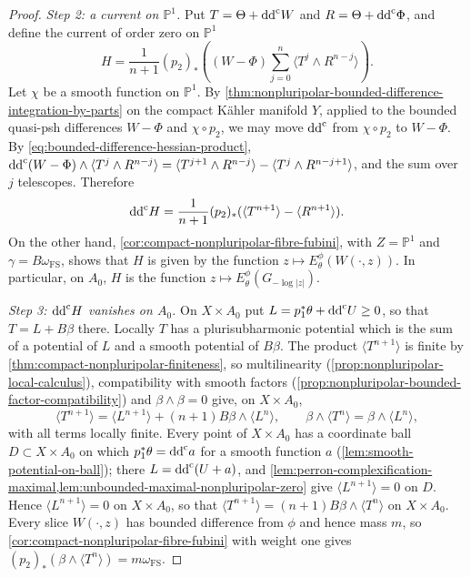 \begin{proof}
\emph{Step 2: a current on $\mathbb P^1$.} Put $T=\Theta+\mathrm{dd}^{\mathrm{c}} W$ and $R=\Theta+\mathrm{dd}^{\mathrm{c}}\Phi$, and define the current of order zero on $\mathbb P^1$
\[
 H=\frac1{n+1}(p_2)_*
       \left((W-\Phi)\sum_{j=0}^n\langle T^j\wedge R^{n-j}\rangle\right).
\]
Let $\chi$ be a smooth function on $\mathbb P^1$. By \cref{thm:nonpluripolar-bounded-difference-integration-by-parts} on the compact K\"ahler manifold $Y$, applied to the bounded quasi-psh differences $W-\Phi$ and $\chi\circ p_2$, we may move $\mathrm{dd}^{\mathrm{c}}$ from $\chi\circ p_2$ to $W-\Phi$. By \eqref{eq:bounded-difference-hessian-product}, $\mathrm{dd}^{\mathrm{c}}(W-\Phi)\wedge\langle T^j\wedge R^{n-j}\rangle=\langle T^{j+1}\wedge R^{n-j}\rangle-\langle T^j\wedge R^{n-j+1}\rangle$, and the sum over $j$ telescopes. Therefore
\begin{equation}\label{eq:relative-geodesic-energy-current-curvature}
 \mathrm{dd}^{\mathrm{c}} H=\frac1{n+1}(p_2)_*
                         (\langle T^{n+1}\rangle-\langle R^{n+1}\rangle).
\end{equation}
On the other hand, \cref{cor:compact-nonpluripolar-fibre-fubini}, with $Z=\mathbb P^1$ and $\gamma=B\omega_{\mathrm{FS}}$, shows that $H$ is given by the function $z\mapsto E_\theta^\phi(W(\cdot,z))$. In particular, on $A_0$, $H$ is the function $z\mapsto E_\theta^\phi(G_{-\log|z|})$.

\emph{Step 3: $\mathrm{dd}^{\mathrm{c}} H$ vanishes on $A_0$.} On $X\times A_0$ put $L=p_1^*\theta+\mathrm{dd}^{\mathrm{c}} U\geq0$, so that $T=L+B\beta$ there. Locally $T$ has a plurisubharmonic potential which is the sum of a potential of $L$ and a smooth potential of $B\beta$. The product $\langle T^{n+1}\rangle$ is finite by \cref{thm:compact-nonpluripolar-finiteness}, so multilinearity (\cref{prop:nonpluripolar-local-calculus}), compatibility with smooth factors (\cref{prop:nonpluripolar-bounded-factor-compatibility}) and $\beta\wedge\beta=0$ give, on $X\times A_0$,
\[
 \langle T^{n+1}\rangle
       =\langle L^{n+1}\rangle+(n+1)B\beta\wedge\langle L^n\rangle,
             \qquad\beta\wedge\langle T^n\rangle
                         =\beta\wedge\langle L^n\rangle,
\]
with all terms locally finite. Every point of $X\times A_0$ has a coordinate ball $D\subset X\times A_0$ on which $p_1^*\theta=\mathrm{dd}^{\mathrm{c}} a$ for a smooth function $a$ (\cref{lem:smooth-potential-on-ball}); there $L=\mathrm{dd}^{\mathrm{c}}(U+a)$, and \cref{lem:perron-complexification-maximal,lem:unbounded-maximal-nonpluripolar-zero} give $\langle L^{n+1}\rangle=0$ on $D$. Hence $\langle L^{n+1}\rangle=0$ on $X\times A_0$, so that $\langle T^{n+1}\rangle=(n+1)B\beta\wedge\langle T^n\rangle$ on $X\times A_0$. Every slice $W(\cdot,z)$ has bounded difference from $\phi$ and hence mass $m$, so \cref{cor:compact-nonpluripolar-fibre-fubini} with weight one gives $(p_2)_*(\beta\wedge\langle T^n\rangle)=m\omega_{\mathrm{FS}}$.


\end{proof}
